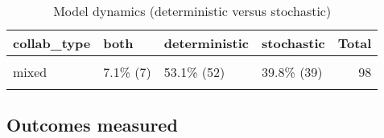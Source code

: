 \documentclass[
]{article}
\begin{document}
\begin{table}[H]

\caption{\label{tab:unnamed-chunk-32}Model dynamics (deterministic versus stochastic)}
\centering
\begin{tabular}[t]{llllr}
\toprule
collab\_type & both & deterministic & stochastic & Total\\
\midrule
\cellcolor{gray!6}{purely\_academic} & \cellcolor{gray!6}{5.4\%  (7)} & \cellcolor{gray!6}{71.3\%  (92)} & \cellcolor{gray!6}{23.3\% (30)} & \cellcolor{gray!6}{129}\\
mixed & 7.1\%  (7) & 53.1\%  (52) & 39.8\% (39) & 98\\
\cellcolor{gray!6}{Total} & \cellcolor{gray!6}{6.2\% (14)} & \cellcolor{gray!6}{63.4\% (144)} & \cellcolor{gray!6}{30.4\% (69)} & \cellcolor{gray!6}{227}\\
\bottomrule
\end{tabular}
\end{table}

\hypertarget{outcomes-measured}{%
\subsection{Outcomes measured}\label{outcomes-measured}}
\end{document}
